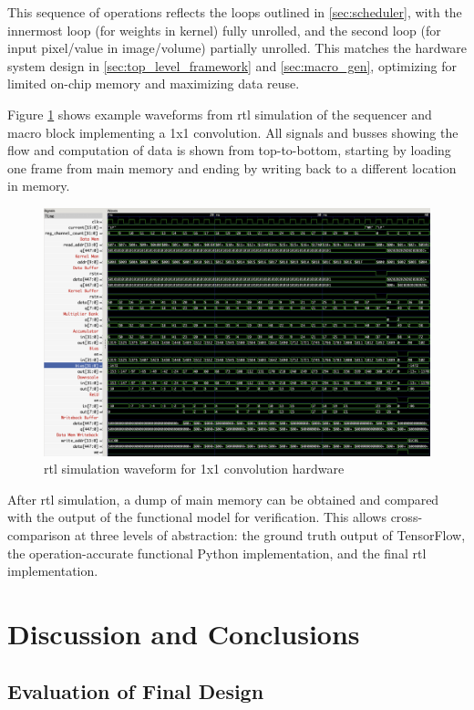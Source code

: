 \documentclass{uw-ece-wkrpt}
\begin{document}
This sequence of operations reflects the loops outlined in \ref{sec:scheduler}, with the innermost loop (for weights in \gls{kernel}) fully unrolled, and the second loop (for input pixel/value in image/volume) partially unrolled. This matches the hardware system design in \ref{sec:top_level_framework} and \ref{sec:macro_gen}, optimizing for limited on-chip memory and maximizing data reuse.

Figure \ref{fig:rtl_simulation_waveform} shows example waveforms from \gls{rtl} simulation of the sequencer and macro block implementing a 1x1 convolution. All signals and busses showing the flow and computation of data is shown from top-to-bottom, starting by loading one frame from main memory and ending by writing back to a different location in memory.

\begin{figure}
\centering
\includegraphics[width=\textwidth]{figures/rtl_simulation_waveform}
\caption{\Gls{rtl} simulation waveform for 1x1 convolution hardware}\label{fig:rtl_simulation_waveform}
\end{figure}

After \gls{rtl} simulation, a dump of main memory can be obtained and compared with the output of the functional model for verification. This allows cross-comparison at three levels of abstraction: the ground truth output of TensorFlow, the operation-accurate functional Python implementation, and the final \gls{rtl} implementation.

\section{Discussion and Conclusions}

\subsection{Evaluation of Final Design}
\end{document}
